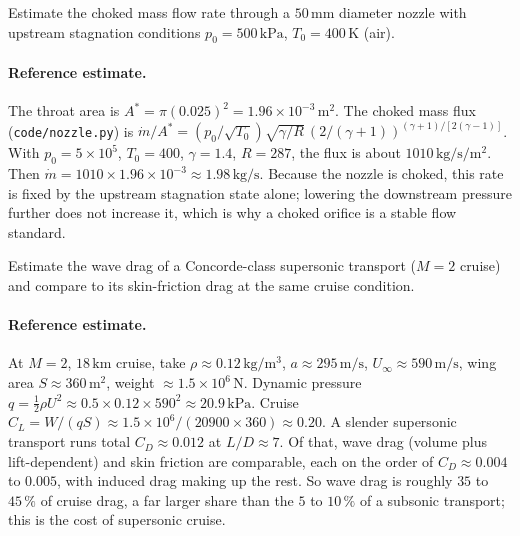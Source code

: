 \begin{exercise}
Estimate the choked mass flow rate through a $50\,\si{\milli\meter}$
diameter nozzle with upstream stagnation conditions $p_0 = 500\,
\text{kPa}$, $T_0 = 400\,\si{\kelvin}$ (air).
\paragraph{Reference estimate.} The throat area is $A^* = \pi
(0.025)^2 = 1.96\times 10^{-3}\,\si{\meter}^2$. The choked mass flux
(\texttt{code/nozzle.py}) is $\dot m/A^* = (p_0/\sqrt{T_0})\sqrt{
\gamma/R}\,(2/(\gamma+1))^{(\gamma+1)/[2(\gamma-1)]}$. With
$p_0 = 5\times 10^{5}$, $T_0 = 400$, $\gamma = 1.4$, $R = 287$, the
flux is about $1010\,\si{\kilogram\per\second}/\si{\meter}^2$. Then
$\dot m = 1010\times 1.96\times 10^{-3} \approx 1.98\,\si{\kilogram
\per\second}$. Because the nozzle is choked, this rate is fixed by the
upstream stagnation state alone; lowering the downstream pressure
further does not increase it, which is why a choked orifice is a
stable flow standard.
\end{exercise}

\begin{exercise}
Estimate the wave drag of a Concorde-class supersonic transport
($M = 2$ cruise) and compare to its skin-friction drag at the
same cruise condition.
\paragraph{Reference estimate.} At $M = 2$, $18\,\si{\kilo\meter}$
cruise, take $\rho \approx 0.12\,\si{\kilogram\per\meter\cubed}$,
$a \approx 295\,\si{\meter\per\second}$, $U_\infty \approx 590\,\si{
\meter\per\second}$, wing area $S \approx 360\,\si{\meter}^2$, weight
$\approx 1.5\times 10^{6}\,\si{\newton}$. Dynamic pressure $q =
\tfrac{1}{2}\rho U^2 \approx 0.5\times 0.12\times 590^2 \approx
20.9\,\text{kPa}$. Cruise $C_L = W/(qS) \approx 1.5\times 10^{6}/
(20900\times 360) \approx 0.20$. A slender supersonic transport runs
total $C_D \approx 0.012$ at $L/D \approx 7$. Of that, wave drag
(volume plus lift-dependent) and skin friction are comparable, each on
the order of $C_D \approx 0.004$ to $0.005$, with induced drag making
up the rest. So wave drag is roughly $35$ to $45\,\%$ of cruise drag,
a far larger share than the $5$ to $10\,\%$ of a subsonic transport;
this is the cost of supersonic cruise.
\end{exercise}

